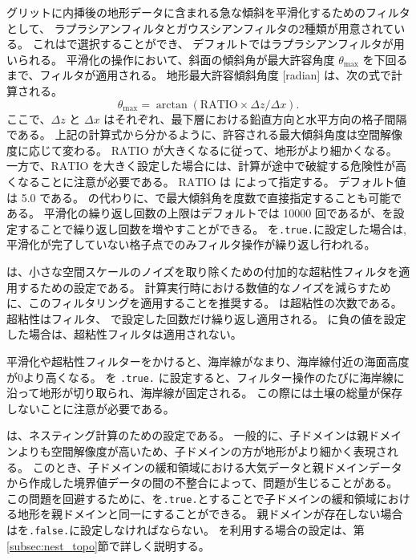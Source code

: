 \scale グリットに内挿後の地形データに含まれる急な傾斜を平滑化するためのフィルタとして、
ラプラシアンフィルタとガウスシアンフィルタの2種類が用意されている。
これはで選択することができ、
デフォルトではラプラシアンフィルタが用いられる。
平滑化の操作において、斜面の傾斜角が最大許容角度 $\theta_{\max}$ を下回るまで、フィルタが適用される。
地形最大許容傾斜角度 [radian] は、次の式で計算される。
\begin{equation*}
  \theta_{\max} = \arctan( \mathrm{RATIO} \times \Delta z / \Delta x ).
\end{equation*}
ここで、$\Delta z$ と $\Delta x$ はそれぞれ、最下層における鉛直方向と水平方向の格子間隔である。
上記の計算式から分かるように、許容される最大傾斜角度は空間解像度に応じて変わる。
$\mathrm{RATIO}$ が大きくなるに従って、地形がより細かくなる。
一方で、$\mathrm{RATIO}$ を大きく設定した場合には、計算が途中で破綻する危険性が高くなることに注意が必要である。
$\mathrm{RATIO}$ は  によって指定する。
デフォルト値は 5.0 である。
 の代わりに、で最大傾斜角を度数で直接指定することも可能である。
平滑化の繰り返し回数の上限はデフォルトでは 10000 回であるが、を設定することで繰り返し回数を増やすことができる。
を\verb|.true.|に設定した場合は, 平滑化が完了していない格子点でのみフィルタ操作が繰り返し行われる。

は、小さな空間スケールのノイズを取り除くための付加的な超粘性フィルタを適用するための設定である。
計算実行時における数値的なノイズを減らすために、このフィルタリングを適用することを推奨する。
 は超粘性の次数である。
超粘性はフィルタ、 で設定した回数だけ繰り返し適用される。
に負の値を設定した場合は、超粘性フィルタは適用されない。

平滑化や超粘性フィルターをかけると、海岸線がなまり、海岸線付近の海面高度が0より高くなる。
 を \verb|.true.| に設定すると、フィルター操作のたびに海岸線に沿って地形が切り取られ、海岸線が固定される。
この際には土壌の総量が保存しないことに注意が必要である。

は、ネスティング計算のための設定である。
一般的に、子ドメインは親ドメインよりも空間解像度が高いため、子ドメインの方が地形がより細かく表現される。
このとき、子ドメインの緩和領域における大気データと親ドメインデータから作成した境界値データの間の不整合によって、問題が生じることがある。
この問題を回避するために、を\verb|.true.|とすることで子ドメインの緩和領域における地形を親ドメインと同一にすることができる。
親ドメインが存在しない場合はを\verb|.false.|に設定しなければならない。
を利用する場合の設定は、第\ref{subsec:nest_topo}節で詳しく説明する。


